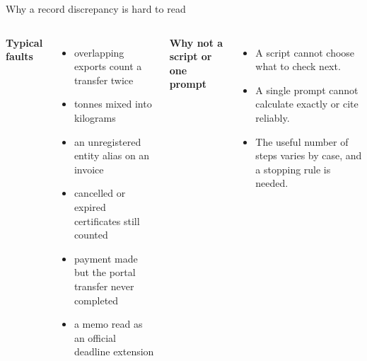 \documentclass[aspectratio=169,10pt]{beamer}
\begin{document}
\begin{frame}{Why a record discrepancy is hard to read}
\begin{columns}[T]
\textbf{Typical faults}
\begin{itemize}
\item overlapping exports count a transfer twice
\item tonnes mixed into kilograms
\item an unregistered entity alias on an invoice
\item cancelled or expired certificates still counted
\item payment made but the portal transfer never completed
\item a memo read as an official deadline extension
\end{itemize}
\textbf{Why not a script or one prompt}
\begin{itemize}
\item A script cannot choose what to check next.
\item A single prompt cannot calculate exactly or cite reliably.
\item The useful number of steps varies by case, and a stopping rule is needed.
\end{itemize}
\end{columns}
\end{frame}
\end{document}
